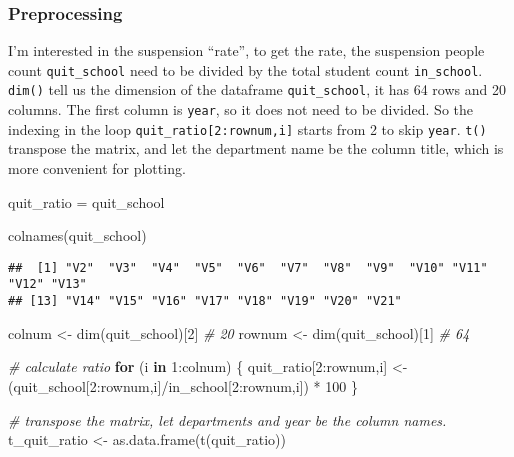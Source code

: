\documentclass[
]{article}
\newenvironment{Shaded}{\begin{snugshade}}{\end{snugshade}}
\newcommand{\CommentTok}[1]{\textcolor[rgb]{0.56,0.35,0.01}{\textit{#1}}}
\newcommand{\ControlFlowTok}[1]{\textcolor[rgb]{0.13,0.29,0.53}{\textbf{#1}}}
\newcommand{\DecValTok}[1]{\textcolor[rgb]{0.00,0.00,0.81}{#1}}
\newcommand{\FunctionTok}[1]{\textcolor[rgb]{0.00,0.00,0.00}{#1}}
\newcommand{\NormalTok}[1]{#1}
\newcommand{\OtherTok}[1]{\textcolor[rgb]{0.56,0.35,0.01}{#1}}
\newcommand{\SpecialCharTok}[1]{\textcolor[rgb]{0.00,0.00,0.00}{#1}}
\begin{document}
\hypertarget{preprocessing}{%
\subsubsection{Preprocessing}\label{preprocessing}}

I'm interested in the suspension ``rate'', to get the rate, the
suspension people count \texttt{quit\_school} need to be divided by the
total student count \texttt{in\_school}. \texttt{dim()} tell us the
dimension of the dataframe \texttt{quit\_school}, it has 64 rows and 20
columns. The first column is \texttt{year}, so it does not need to be
divided. So the indexing in the loop
\texttt{quit\_ratio{[}2:rownum,i{]}} starts from 2 to skip
\texttt{year}. \texttt{t()} transpose the matrix, and let the department
name be the column title, which is more convenient for plotting.

\begin{Shaded}
\begin{Highlighting}[]
\NormalTok{quit\_ratio }\OtherTok{=}\NormalTok{ quit\_school}

\FunctionTok{colnames}\NormalTok{(quit\_school)}
\end{Highlighting}
\end{Shaded}

\begin{verbatim}
##  [1] "V2"  "V3"  "V4"  "V5"  "V6"  "V7"  "V8"  "V9"  "V10" "V11" "V12" "V13"
## [13] "V14" "V15" "V16" "V17" "V18" "V19" "V20" "V21"
\end{verbatim}

\begin{Shaded}
\begin{Highlighting}[]
\NormalTok{colnum }\OtherTok{\textless{}{-}} \FunctionTok{dim}\NormalTok{(quit\_school)[}\DecValTok{2}\NormalTok{] }\CommentTok{\# 20}
\NormalTok{rownum }\OtherTok{\textless{}{-}} \FunctionTok{dim}\NormalTok{(quit\_school)[}\DecValTok{1}\NormalTok{] }\CommentTok{\# 64}

\CommentTok{\# calculate ratio}
\ControlFlowTok{for}\NormalTok{ (i }\ControlFlowTok{in} \DecValTok{1}\SpecialCharTok{:}\NormalTok{colnum) \{}
\NormalTok{    quit\_ratio[}\DecValTok{2}\SpecialCharTok{:}\NormalTok{rownum,i] }\OtherTok{\textless{}{-}}\NormalTok{ (quit\_school[}\DecValTok{2}\SpecialCharTok{:}\NormalTok{rownum,i]}\SpecialCharTok{/}\NormalTok{in\_school[}\DecValTok{2}\SpecialCharTok{:}\NormalTok{rownum,i]) }\SpecialCharTok{*} \DecValTok{100}
\NormalTok{\}}

\CommentTok{\# transpose the matrix, let departments and year be the column names. }
\NormalTok{t\_quit\_ratio }\OtherTok{\textless{}{-}}  \FunctionTok{as.data.frame}\NormalTok{(}\FunctionTok{t}\NormalTok{(quit\_ratio))}
\end{Highlighting}
\end{Shaded}
\end{document}
